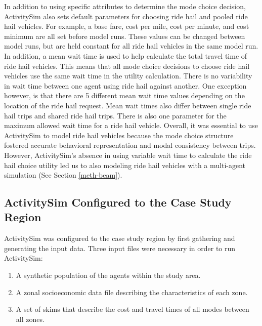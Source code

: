 \documentclass[12pt, oneside, openright]{byuthesis}
\providecommand{\tightlist}{%
  \setlength{\itemsep}{0pt}\setlength{\parskip}{0pt}}
\begin{document}
In addition to using specific attributes to determine the mode choice decision, ActivitySim also sets default parameters for choosing ride hail and pooled ride hail vehicles. For example, a base fare, cost per mile, cost per minute, and cost minimum are all set before model runs. These values can be changed between model runs, but are held constant for all ride hail vehicles in the same model run. In addition, a mean wait time is used to help calculate the total travel time of ride hail vehicles. This means that all mode choice decisions to choose ride hail vehicles use the same wait time in the utility calculation. There is no variability in wait time between one agent using ride hail against another. One exception however, is that there are 5 different mean wait time values depending on the location of the ride hail request. Mean wait times also differ between single ride hail trips and shared ride hail trips. There is also one parameter for the maximum allowed wait time for a ride hail vehicle. Overall, it was essential to use ActivitySim to model ride hail vehicles because the mode choice structure fostered accurate behavioral representation and modal consistency between trips. However, ActivitySim's absence in using variable wait time to calculate the ride hail choice utility led us to also modeling ride hail vehicles with a multi-agent simulation (See Section \ref{meth-beam}).

\hypertarget{activitysim-configured-to-the-case-study-region}{%
\subsection{ActivitySim Configured to the Case Study Region}\label{activitysim-configured-to-the-case-study-region}}

ActivitySim was configured to the case study region by first gathering and generating the input data. Three input files were necessary in order to run ActivitySim:

\begin{enumerate}
\def\labelenumi{\arabic{enumi}.}
\tightlist
\item
  A synthetic population of the agents within the study area.
\item
  A zonal socioeconomic data file describing the characteristics of each zone.
\item
  A set of skims that describe the cost and travel times of all modes between all zones.
\end{enumerate}
\end{document}
